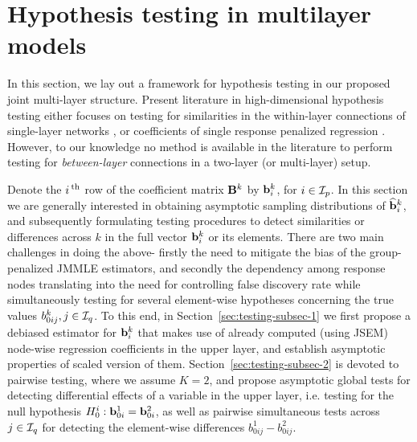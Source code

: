 \section{Hypothesis testing in multilayer models}
\label{sec:sec3}
In this section, we lay out a framework for hypothesis testing in our proposed joint multi-layer structure. Present literature in high-dimensional hypothesis testing either focuses on testing for similarities in the within-layer connections of single-layer networks \citep{CaiLiu16,Liu17}, or coefficients of single response penalized regression \citep{vanDeGeerEtal14,ZhangZhang14,MitraZhang16}. However, to our knowledge no method is available in the literature to perform testing for {\it between-layer} connections in a two-layer (or multi-layer) setup.

Denote the $i\operatorname*{^{\text{th}}}$ row of the coefficient matrix ${\mathbf{B}}^k$ by ${\bf{b}}_i^k$, for $i \in {\cal{I}}_p$. In this section we are generally interested in obtaining asymptotic sampling distributions of $\widehat {{\bf{b}}}_i^k$, and subsequently formulating testing procedures to detect similarities or differences across $k$ in the full vector ${\bf{b}}_i^k$ or its elements. There are two main challenges in doing the above- firstly the need to mitigate the bias of the group-penalized JMMLE estimators, and secondly the dependency among response nodes translating into the need for controlling false discovery rate while simultaneously testing for several element-wise hypotheses concerning the true values $b_{0 ij}^k, j \in {\cal{I}}_q$. To this end, in Section~\ref{sec:testing-subsec-1} we first propose a debiased estimator for ${\bf{b}}_i^k$ that makes use of already computed (using JSEM) node-wise regression coefficients in the upper layer, and establish asymptotic properties of scaled version of them. Section~\ref{sec:testing-subsec-2} is devoted to pairwise testing, where we assume $K=2$, and propose asymptotic global tests for detecting differential effects of a variable in the upper layer, i.e. testing for the null hypothesis $H_0^i: {\bf{b}}_{0 i}^1 = {\bf{b}}_{0 i}^2$, as well as pairwise simultaneous tests across $j \in {\cal{I}}_q$ for detecting the element-wise differences $b_{0 ij}^1 - b_{0 ij}^2$.


